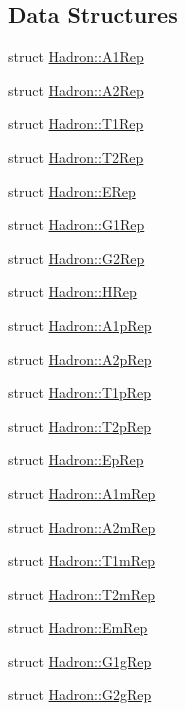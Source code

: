 \subsection*{Data Structures}
\begin{DoxyCompactItemize}
\item 
struct \mbox{\hyperlink{structHadron_1_1A1Rep}{Hadron\+::\+A1\+Rep}}
\item 
struct \mbox{\hyperlink{structHadron_1_1A2Rep}{Hadron\+::\+A2\+Rep}}
\item 
struct \mbox{\hyperlink{structHadron_1_1T1Rep}{Hadron\+::\+T1\+Rep}}
\item 
struct \mbox{\hyperlink{structHadron_1_1T2Rep}{Hadron\+::\+T2\+Rep}}
\item 
struct \mbox{\hyperlink{structHadron_1_1ERep}{Hadron\+::\+E\+Rep}}
\item 
struct \mbox{\hyperlink{structHadron_1_1G1Rep}{Hadron\+::\+G1\+Rep}}
\item 
struct \mbox{\hyperlink{structHadron_1_1G2Rep}{Hadron\+::\+G2\+Rep}}
\item 
struct \mbox{\hyperlink{structHadron_1_1HRep}{Hadron\+::\+H\+Rep}}
\item 
struct \mbox{\hyperlink{structHadron_1_1A1pRep}{Hadron\+::\+A1p\+Rep}}
\item 
struct \mbox{\hyperlink{structHadron_1_1A2pRep}{Hadron\+::\+A2p\+Rep}}
\item 
struct \mbox{\hyperlink{structHadron_1_1T1pRep}{Hadron\+::\+T1p\+Rep}}
\item 
struct \mbox{\hyperlink{structHadron_1_1T2pRep}{Hadron\+::\+T2p\+Rep}}
\item 
struct \mbox{\hyperlink{structHadron_1_1EpRep}{Hadron\+::\+Ep\+Rep}}
\item 
struct \mbox{\hyperlink{structHadron_1_1A1mRep}{Hadron\+::\+A1m\+Rep}}
\item 
struct \mbox{\hyperlink{structHadron_1_1A2mRep}{Hadron\+::\+A2m\+Rep}}
\item 
struct \mbox{\hyperlink{structHadron_1_1T1mRep}{Hadron\+::\+T1m\+Rep}}
\item 
struct \mbox{\hyperlink{structHadron_1_1T2mRep}{Hadron\+::\+T2m\+Rep}}
\item 
struct \mbox{\hyperlink{structHadron_1_1EmRep}{Hadron\+::\+Em\+Rep}}
\item 
struct \mbox{\hyperlink{structHadron_1_1G1gRep}{Hadron\+::\+G1g\+Rep}}
\item 
struct \mbox{\hyperlink{structHadron_1_1G2gRep}{Hadron\+::\+G2g\+Rep}}
\item 

\end{DoxyCompactItemize}
